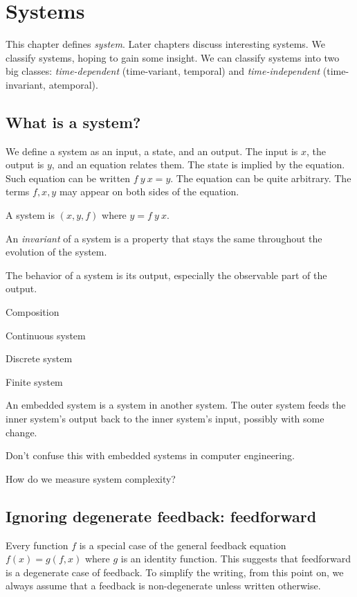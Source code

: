 \chapter{Systems}

This chapter defines \emph{system}.
Later chapters discuss interesting systems.
We classify systems, hoping to gain some insight.
We can classify systems into two big classes:
\emph{time-dependent} (time-variant, temporal)
and \emph{time-independent} (time-invariant, atemporal).

\section{What is a system?}

We define a system as an input, a state, and an output.
The input is \(x\), the output is \(y\), and an equation relates them.
The state is implied by the equation.
Such equation can be written \(f~y~x = y\).
The equation can be quite arbitrary.
The terms \(f,x,y\) may appear on both sides of the equation.

\begin{m:def}[System]
A system is \((x,y,f)\) where \(y=f~y~x\).
\end{m:def}

An \emph{invariant} of a system is a property that stays
the same throughout the evolution of the system.

The behavior of a system is its output, especially the observable part of the output.

Composition

Continuous system

Discrete system

Finite system

An embedded system is a system in another system.
The outer system feeds the inner system's output back to the inner system's input,
possibly with some change.

Don't confuse this with embedded systems in computer engineering.

How do we measure system complexity?

\section{Ignoring degenerate feedback: feedforward}

Every function \(f\) is a special case of the general feedback equation \(f(x) = g(f,x)\)
where \(g\) is an identity function.
This suggests that feedforward is a degenerate case of feedback.
To simplify the writing, from this point on,
we always assume that a feedback is non-degenerate
unless written otherwise.


